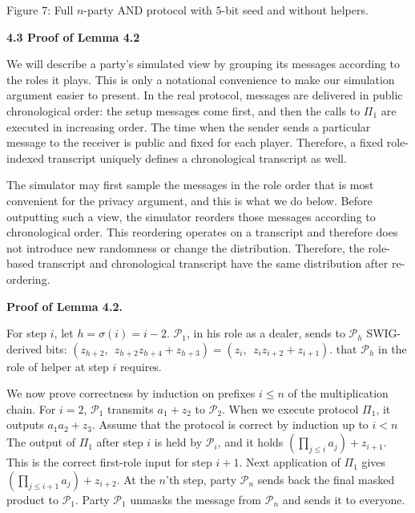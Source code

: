 \documentclass[10pt,a4paper]{article}
\begin{document}
Figure 7: Full $n$-party AND protocol with $5$-bit seed and without helpers.




\par\medskip\noindent\textbf{
4.3 Proof of Lemma 4.2
}\par




We will describe a party’s simulated view by grouping its messages according to
the roles it plays. This is only a notational convenience to make our simulation argument easier to present. In the real protocol,
messages are delivered in public chronological order: the setup messages
come first, and then the calls to $\Pi_{1}$ are executed in increasing order. The time when the sender sends a particular message to the receiver is public and fixed for each player. Therefore, a fixed
role-indexed transcript uniquely defines a chronological transcript as well.\par




The simulator may first sample the messages in the role order that is most
convenient for the privacy argument, and this is what we do below. Before outputting such a view, the simulator
reorders those messages according to chronological order. This reordering operates on a transcript and therefore does not introduce new randomness or change the distribution. Therefore, the role-based transcript and chronological transcript have the same distribution after re-ordering.\par




\par\medskip\noindent\textbf{Proof of Lemma 4.2.}\par




For step $i$, let $h=\sigma(i)=i-2$. $\mathcal{P}_{1}$, in his role as a dealer, sends to
$\mathcal{P}_{h}$ SWIG-derived bits:
$(z_{h+2},\ \ z_{h+2}z_{h+4}+z_{h+3})=(z_{i},\ \ z_{i}z_{i+2}+z_{i+1}).$
that $\mathcal{P}_{h}$ in the role of helper at step $i$ requires.\par




We now prove correctness by induction on prefixes $i\leq n$ of the multiplication chain. For $i=2$, $\mathcal{P}_{1}$
transmits $a_{1}+z_{2}$ to $\mathcal{P}_{2}$. When we execute protocol $\Pi_{1}$, it outputs
$a_{1}a_{2}+z_{3}$. Assume that the protocol is correct by induction up to $i<n$ The
output of $\Pi_{1}$ after step $i$ is held by $\mathcal{P}_{i}$, and it holds
$\left(\prod_{j\leq i}a_{j}\right)+z_{i+1}$.
This is the correct first-role input for step $i+1$. Next application of
$\Pi_{1}$ gives
$\left(\prod_{j\leq i+1}a_{j}\right)+z_{i+2}$.
At the $n$’th step, party $\mathcal{P}_{n}$ sends back the final masked product to
$\mathcal{P}_{1}$. Party $\mathcal{P}_{1}$ unmasks the message from
$\mathcal{P}_{n}$ and sends it to everyone.\par
\end{document}
